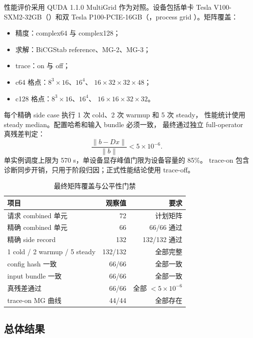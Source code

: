 \documentclass[UTF8,a4paper,11pt,fontset=none]{ctexart}
\numberwithin{equation}{section}
\numberwithin{figure}{section}
\numberwithin{table}{section}
\newcommand{\code}[1]{\texttt{\detokenize{#1}}}
\begin{document}
性能评价采用 QUDA 1.1.0 MultiGrid 作为对照。设备包括单卡
Tesla V100-SXM2-32GB（\code{sm_70}）和双
Tesla P100-PCIE-16GB（\code{sm_60}，process grid
\code{2x1x1x1}）。矩阵覆盖：
\begin{itemize}
  \item 精度：complex64 与 complex128；
  \item 求解：BiCGStab reference、MG-2、MG-3；
  \item trace：on 与 off；
  \item c64 格点：\(8^3\times16\)、\(16^4\)、
        \(16\times32\times32\times48\)；
  \item c128 格点：\(8^3\times16\)、\(16^4\)、
        \(16\times16\times32\times32\)。
\end{itemize}
每个精确 side case 执行 1 次 cold、2 次 warmup 和 5 次 steady，
性能统计使用 steady median。配置哈希和输入 bundle 必须一致，
最终通过独立 full-operator 真残差判定：
\begin{equation}
 \frac{\lVert b-Dx\rVert}{\lVert b\rVert}<5\times10^{-6}.
\label{eq:true-residual-gate}
\end{equation}
单实例调度上限为 570 s，单设备显存峰值门限为设备容量的 85\%。
trace-on 包含诊断同步开销，只用于阶段归因；正式性能结论使用
trace-off。

\begin{table}[htbp]
\centering
\caption{最终矩阵覆盖与公平性门禁}
\label{tab:coverage}
\small
\begin{tabular}{@{}lrr@{}}
\toprule
项目 & 观察值 & 要求 \\
\midrule
请求 combined 单元 & 72 & 计划矩阵 \\
精确 combined 单元 & 66 & 66/66 通过 \\
精确 side record & 132 & 132/132 通过 \\
1 cold / 2 warmup / 5 steady & 132/132 & 全部完整 \\
config hash 一致 & 66/66 & 全部一致 \\
input bundle 一致 & 66/66 & 全部一致 \\
真残差通过 & 66/66 & 全部 \(<5\times10^{-6}\) \\
trace-on MG 曲线 & 44/44 & 全部存在 \\
\bottomrule
\end{tabular}
\end{table}

\subsection{总体结果}
\end{document}
